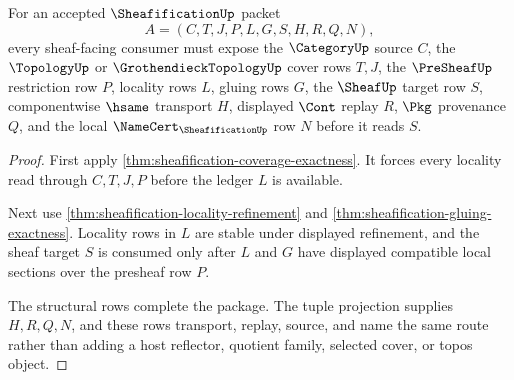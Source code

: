 \begin{theorem}
\label{thm:sheafification-source-obligation-package}
For an accepted $\SheafificationUp$ packet
$$
A=(C,T,J,P,L,G,S,H,R,Q,N),
$$
every sheaf-facing consumer must expose the $\CategoryUp$ source $C$, the $\TopologyUp$ or $\GrothendieckTopologyUp$ cover rows $T,J$, the $\PreSheafUp$ restriction row $P$, locality rows $L$, gluing rows $G$, the $\SheafUp$ target row $S$, componentwise $\hsame$ transport $H$, displayed $\Cont$ replay $R$, $\Pkg$ provenance $Q$, and the local $\NameCert_{\SheafificationUp}$ row $N$ before it reads $S$.
\end{theorem}
\begin{proof}
First apply \autoref{thm:sheafification-coverage-exactness}. It forces every locality read through $C,T,J,P$ before the ledger $L$ is available.

Next use \autoref{thm:sheafification-locality-refinement} and \autoref{thm:sheafification-gluing-exactness}. Locality rows in $L$ are stable under displayed refinement, and the sheaf target $S$ is consumed only after $L$ and $G$ have displayed compatible local sections over the presheaf row $P$.

The structural rows complete the package. The tuple projection supplies $H,R,Q,N$, and these rows transport, replay, source, and name the same route rather than adding a host reflector, quotient family, selected cover, or topos object.
\end{proof}

